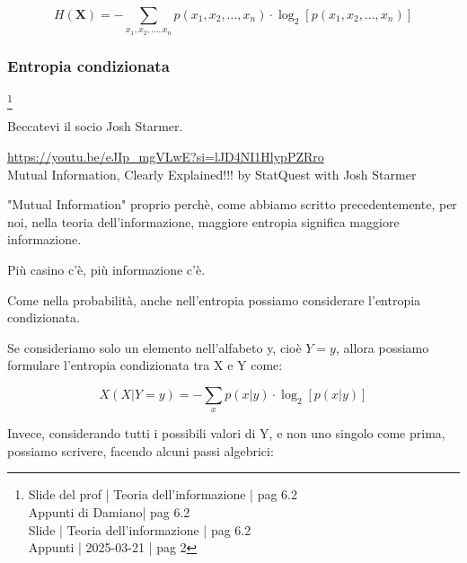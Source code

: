 {
    \Large 
    \begin{equation}
        H (\textbf{X}) 
        = 
        - 
        \sum_{x_1, x_2, \dots, x_n}
         p(x_1, x_2, \dots, x_n) \cdot \log_{2} \left[ p(x_1, x_2, \dots, x_n)\right]
    \end{equation}
}

\newpage 

\subsubsection{Entropia condizionata}
\footnote{Slide del prof | Teoria dell'informazione | pag 6.2 \\  
Appunti di Damiano| pag 6.2 \\
Slide | Teoria dell'informazione | pag 6.2 \\
Appunti | 2025-03-21 | pag 2
 }

\begin{tcolorbox}
    Beccatevi il socio Josh Starmer. \newline 

    \url{https://youtu.be/eJIp_mgVLwE?si=lJD4NI1HlypPZRro} \\
    Mutual Information, Clearly Explained!!! by StatQuest with Josh Starmer \newline 

    "Mutual Information" proprio perchè, come abbiamo scritto precedentemente, per noi, nella teoria dell'informazione, 
    maggiore entropia significa maggiore informazione. \newline 

    Più casino c'è, più informazione c'è. 
\end{tcolorbox}


Come nella probabilità, anche nell'entropia possiamo considerare l'entropia condizionata. \newline 

Se consideriamo solo un elemento nell'alfabeto y, cioè $Y = y$, 
allora possiamo formulare l'entropia condizionata tra X e Y come: 

{
    \Large 
    \begin{equation}
        X (X | Y = y)
        = 
        - 
        \sum_{x}
        p(x | y) \cdot \log_{2} \left[ p(x | y) \right]
    \end{equation}
}

Invece, considerando tutti i possibili valori di Y, e non uno singolo come prima, 
possiamo scrivere, facendo alcuni passi algebrici:

